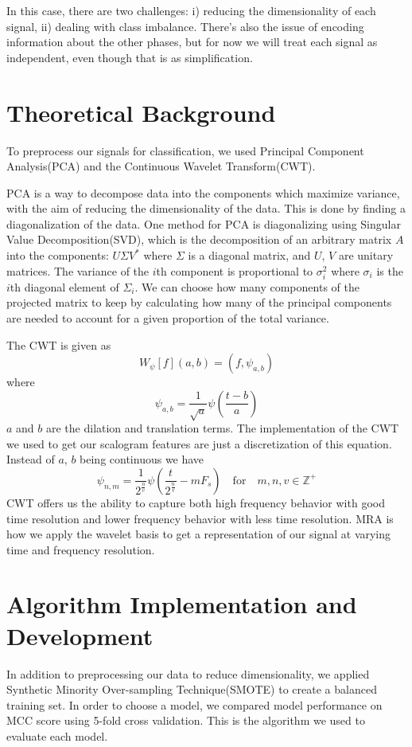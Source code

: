 \documentclass{article}
\begin{document}
In this case, there are two challenges: i) reducing the dimensionality of each
signal, ii) dealing with class imbalance. There's also the issue of encoding
information about the other phases, but for now we will treat each signal as
independent, even though that is as simplification.

\section{Theoretical Background}
To preprocess our signals for classification, we used Principal Component
Analysis(PCA) and the Continuous Wavelet Transform(CWT).

PCA is a way to decompose data into the components which maximize variance, with
the aim of reducing the dimensionality of the data. This is done by finding a
diagonalization of the data. One method for PCA is diagonalizing using Singular
Value Decomposition(SVD), which is the decomposition of an arbitrary matrix $A$
into the components: $U \Sigma V^*$ where $\Sigma$ is a diagonal matrix, and
$U$, $V$ are unitary matrices. The variance of the $i$th component is
proportional to $\sigma_i^2$ where $\sigma_i$ is the $i$th diagonal element of
$\Sigma_i$. We can choose how many components of the projected matrix to keep by
calculating how many of the principal components are needed to account for
a given proportion of the total variance.

The CWT is given as
$$
W_\psi[f](a, b) = (f, \psi_{a, b})
$$
where
$$
\psi_{a, b} = \frac{1}{\sqrt{a}}\psi(\frac{t - b}{a})
$$
$a$ and $b$ are the dilation and translation terms. The implementation of the
CWT we used to get our scalogram features are just a discretization of this
equation. Instead of $a$, $b$ being continuous we have
$$
\psi_{n, m} = \frac{1}{2^\frac{n}{v}}\psi(\frac{t}{2^\frac{n}{v}} - m F_s) \quad \mathrm{for}\quad m, n, v \in \mathbb{Z^+}
$$
CWT offers us the ability to capture both high frequency behavior with good time
resolution and lower frequency behavior with less time resolution. MRA is how we
apply the wavelet basis to get a representation of our signal at varying time
and frequency resolution.


\section{Algorithm Implementation and Development}
In addition to preprocessing our data to reduce dimensionality, we applied
Synthetic Minority Over-sampling Technique(SMOTE) to create a balanced training
set. In order to choose a model, we compared model performance on MCC score
using 5-fold cross validation. This is the algorithm we used to evaluate each model.
\end{document}
